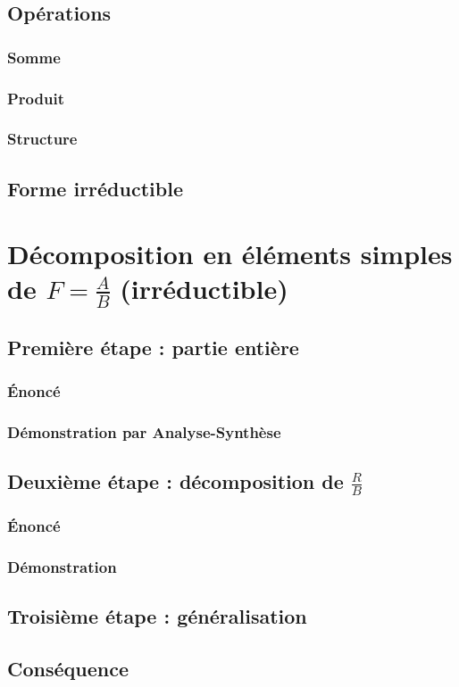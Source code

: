 \documentclass[12pt,a4paper,french]{book}
\begin{document}
		\subsection{Opérations}
			\subsubsection{Somme}
			\subsubsection{Produit}
			\subsubsection{Structure}
		\subsection{Forme irréductible}
	\section{Décomposition en éléments simples de $F = \frac{A}{B}$ (irréductible)}
		\subsection{Première étape : partie entière}
			\subsubsection{Énoncé}
			\subsubsection{Démonstration par Analyse-Synthèse}
		\subsection{Deuxième étape : décomposition de $\frac{R}{B}$}
			\subsubsection{Énoncé}
			\subsubsection{Démonstration}
		\subsection{Troisième étape : généralisation}
		\subsection{Conséquence}
\end{document}

